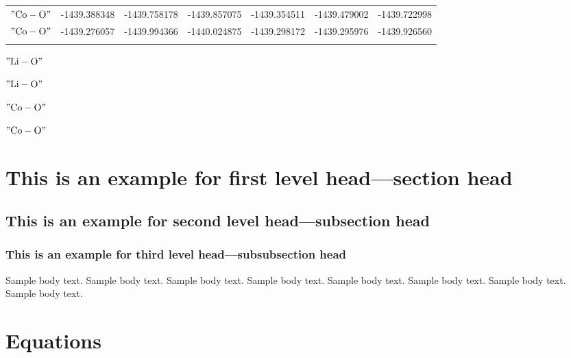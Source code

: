 \documentclass[pdflatex,sn-mathphys-num]{sn-jnl}%
\theoremstyle{thmstyleone}%
\theoremstyle{thmstyletwo}%
\theoremstyle{thmstylethree}%
\begin{document}
\begin{table}
\begin{tabular*}{\textwidth}{@{\extracolsep\fill}lcccccc}
$\mathrm{"Co-O"}$\footnotemark[1] & -1439.388348 & -1439.758178 & -1439.857075 & -1439.354511 & -1439.479002 & -1439.722998 \\
$\mathrm{"Co-O"}$\footnotemark[2] & -1439.276057 & -1439.994366 & -1440.024875 & -1439.298172 & -1439.295976 & -1439.926560 \\
\botrule
\end{tabular*}
$\mathrm{"Li-O"}$

$\mathrm{"Li-O"}$

$\mathrm{"Co-O"}$

$\mathrm{"Co-O"}$
\end{table}

\section{This is an example for first level head---section head}\label{sec3}

\subsection{This is an example for second level head---subsection head}\label{subsec2}

\subsubsection{This is an example for third level head---subsubsection head}\label{subsubsec2}

Sample body text. Sample body text. Sample body text. Sample body text. Sample body text. Sample body text. Sample body text. Sample body text. 

\section{Equations}\label{sec4}
\end{document}
